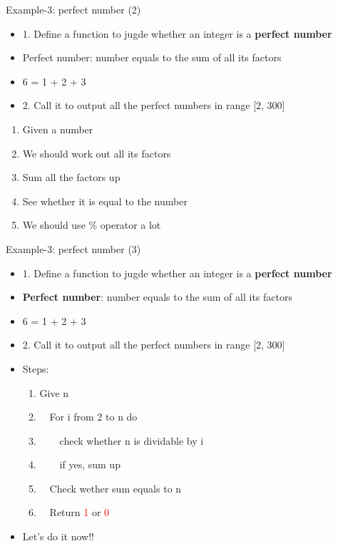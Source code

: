 \begin{frame}[fragile]{Example-3: perfect number (2)}
\begin{itemize}
	\item {1. Define a function to jugde whether an integer is a \textbf{perfect number}}
	\item {Perfect number: number equals to the sum of all its factors}
	\item {6 = 1 + 2 + 3}
	\item {2. Call it to output all the perfect numbers in range [2, 300]}
\end{itemize}
\begin{enumerate}
	\item {Given a number}
	\item {We should work out all its factors}
	\item {Sum all the factors up}
	\item {See whether it is equal to the number}
	\item {We should use \% operator a lot}
\end{enumerate}
\end{frame}

\begin{frame}[fragile]{Example-3: perfect number (3)}
\begin{itemize}
	\item {1. Define a function to jugde whether an integer is a \textbf{perfect number}}
	\item {\textbf{Perfect number}: number equals to the sum of all its factors}
	\item {6 = 1 + 2 + 3}
	\item {2. Call it to output all the perfect numbers in range [2, 300]}
	\item {Steps:}
	\begin{enumerate}
		\item {Give n}
		\item {~~For i from 2 to n do}
		\item {~~~~check whether n is dividable by i}
		\item {~~~~if yes, sum up}
		\item {~~Check wether sum equals to n}
		\item {~~Return \textcolor{red}{1} or \textcolor{red}{0}}
	\end{enumerate}
	\item {Let's do it now!!}
\end{itemize}
\end{frame}

